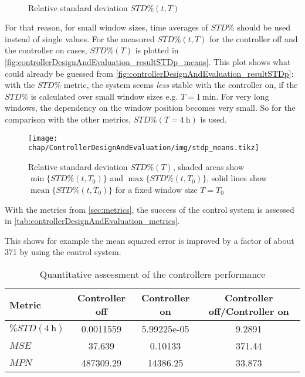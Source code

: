 \begin{figure}[tb]
    \centering
        \\
       \caption{Relative standard deviation $STD\%(t,T)$}
    \label{fig:controllerDesignAndEvaluation_resultSTDp}
\end{figure}

For that reason, for small window sizes, time averages of $STD\%$ should be used instead of single values. For the measured $STD\%(t,T)$ for the controller off and the controller on cases, $STD\%(T)$ is plotted in \autoref{fig:controllerDesignAndEvaluation_resultSTDp_means}. This plot shows what could already be guessed from \autoref{fig:controllerDesignAndEvaluation_resultSTDp}: with the $STD\%$ metric, the system seems \textit{less} stable with the controller on, if the $STD\%$ is calculated over small window sizes e.g. $T=\SI{1}{\minute}$. For very long windows, the dependency on the window position becomes very small. So for the comparison with the other metrics, $STD\%(T=\SI{4}{\hour})$ is used.

\begin{figure}[tb]
	\centering
	\texttt{[image: chap/ControllerDesignAndEvaluation/img/stdp\_means.tikz]}
	\caption{Relative standard deviation $STD\%(T)$, shaded areas show $\operatorname{min}\{STD\%(t,T_0)\}$ and $\operatorname{max}\{STD\%(t,T_0)\}$, solid lines show $\operatorname{mean}\{STD\%(t,T_0)\}$ for a fixed window size $T=T_0$}
	\label{fig:controllerDesignAndEvaluation_resultSTDp_means}
\end{figure}


With the metrics from \autoref{sec:metrics}, the success of the control system is assessed in \autoref{tab:controllerDesignAndEvaluation_metrics}.

This shows for example the mean squared error is improved by a factor of about \num{371} by using the control system.

\begin{table}[tbh]
\centering
\caption{Quantitative assessment of the controllers performance}\label{tab:controllerDesignAndEvaluation_metrics}
\begin{tabular}{lSSS}
	\toprule
	Metric                 & {Controller off} & {Controller on} & {Controller off/Controller on} \\ \midrule
	$\%STD(\SI{4}{\hour})$ & 0.0011559        & 5.99225e-05     & 9.2891                         \\
	$MSE$                  & 37.639           & 0.10133         & 371.44                         \\
	$MPN$                  & 487309.29        & 14386.25        & 33.873                         \\ \bottomrule
\end{tabular}
\end{table}

